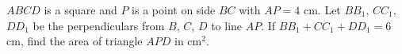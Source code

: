 $ABCD$ is a square and $P$ is a point on side $BC$ with $AP=4$ cm. Let $BB_1$, $CC_1$, $DD_1$ be the perpendiculars from $B$, $C$, $D$ to line $AP$. If $BB_1+CC_1+DD_1=6$ cm, find the area of triangle $APD$ in cm$^2$.

